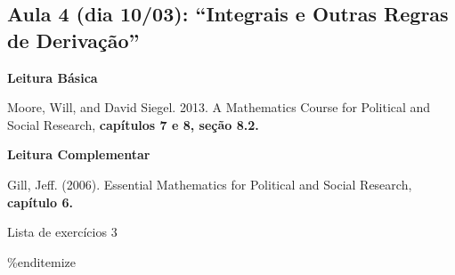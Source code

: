 \documentclass[a4paper, 12pt]{article}
\renewenvironment{itemize}{
  \begin{list}{}{
    \setlength{\leftmargin}{1.5em}
  }
}{
  \end{list}
}
\begin{document}
\subsection*{\textbf{Aula 4} (dia 10/03): ``Integrais e Outras Regras de Derivação''} 
\begin{itemize}

\item \textbf{Leitura Básica}

\item Moore, Will, and David Siegel. 2013. A Mathematics Course for Political and Social Research, \textbf{capítulos 7 e 8, seção 8.2.}

\item \textbf{Leitura Complementar}

\item Gill, Jeff. (2006). Essential Mathematics for Political and Social Research,  \textbf{capítulo 6.}

\item Lista de exercícios 3

\end{itemize}









\%end{itemize}


\vspace{1.0cm}
\end{document}
